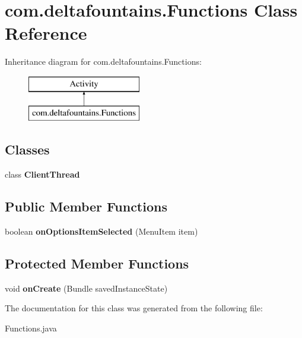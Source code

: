 \hypertarget{classcom_1_1deltafountains_1_1Functions}{\section{com.\-deltafountains.\-Functions Class Reference}
\label{classcom_1_1deltafountains_1_1Functions}
}
Inheritance diagram for com.\-deltafountains.\-Functions\-:\begin{figure}[H]
\begin{center}
\leavevmode
\includegraphics[height=2.000000cm]{classcom_1_1deltafountains_1_1Functions}
\end{center}
\end{figure}
\subsection*{Classes}
\begin{DoxyCompactItemize}
\item 
class {\bfseries Client\-Thread}
\end{DoxyCompactItemize}
\subsection*{Public Member Functions}
\begin{DoxyCompactItemize}
\item 
\hypertarget{classcom_1_1deltafountains_1_1Functions_a39dce752a9e7bea4e975352020e7b44f}{boolean {\bfseries on\-Options\-Item\-Selected} (Menu\-Item item)}\label{classcom_1_1deltafountains_1_1Functions_a39dce752a9e7bea4e975352020e7b44f}

\end{DoxyCompactItemize}
\subsection*{Protected Member Functions}
\begin{DoxyCompactItemize}
\item 
\hypertarget{classcom_1_1deltafountains_1_1Functions_a3660032f995c222019bfa8e15ed0ea62}{void {\bfseries on\-Create} (Bundle saved\-Instance\-State)}\label{classcom_1_1deltafountains_1_1Functions_a3660032f995c222019bfa8e15ed0ea62}

\end{DoxyCompactItemize}


The documentation for this class was generated from the following file\-:\begin{DoxyCompactItemize}
\item 
Functions.\-java\end{DoxyCompactItemize}
